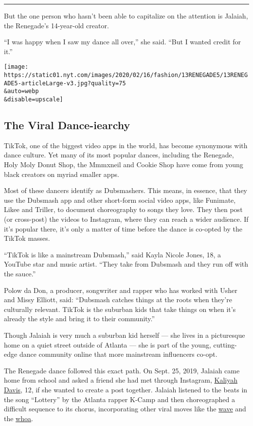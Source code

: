 \begin{center}\rule{0.5\linewidth}{\linethickness}\end{center}

But the one person who hasn't been able to capitalize on the attention
is Jalaiah, the Renegade's 14-year-old creator.

``I was happy when I saw my dance all over,'' she said. ``But I wanted
credit for it.''

\texttt{[image: https://static01.nyt.com/images/2020/02/16/fashion/13RENEGADE5/13RENEGADE5-articleLarge-v3.jpg?quality=75\\\&auto=webp\\\&disable=upscale]}

\hypertarget{the-viral-dance-iearchy}{%
\subsection{The Viral Dance-iearchy}\label{the-viral-dance-iearchy}}

TikTok, one of the biggest video apps in the world, has become
synonymous with dance culture. Yet many of its most popular dances,
including the Renegade, Holy Moly Donut Shop, the Mmmxneil and Cookie
Shop have come from young black creators on myriad smaller apps.

Most of these dancers identify as Dubsmashers. This means, in essence,
that they use the Dubsmash app and other short-form social video apps,
like Funimate, ‎Likee and Triller, to document choreography to songs
they love. They then post (or cross-post) the videos to Instagram, where
they can reach a wider audience. If it's popular there, it's only a
matter of time before the dance is co-opted by the TikTok masses.

``TikTok is like a mainstream Dubsmash,'' said Kayla Nicole Jones, 18, a
YouTube star and music artist. ``They take from Dubsmash and they run
off with the sauce.''

Polow da Don, a producer, songwriter and rapper who has worked with
Usher and Missy Elliott, said: ``Dubsmash catches things at the roots
when they're culturally relevant. TikTok is the suburban kids that take
things on when it's already the style and bring it to their community.''

Though Jalaiah is very much a suburban kid herself --- she lives in a
picturesque home on a quiet street outside of Atlanta --- she is part of
the young, cutting-edge dance community online that more mainstream
influencers co-opt.

The Renegade dance followed this exact path. On Sept. 25, 2019, Jalaiah
came home from school and asked a friend she had met through Instagram,
\href{https://www.instagram.com/chillingwk/}{Kaliyah Davis}, 12, if she
wanted to create a post together. Jalaiah listened to the beats in the
song ``Lottery'' by the Atlanta rapper K-Camp and then choreographed a
difficult sequence to its chorus, incorporating other viral moves like
the \href{https://www.youtube.com/watch?v=6CPtOe3GVwk}{wave} and the
\href{https://www.youtube.com/watch?v=ZPNfN63WgXw}{whoa}.

